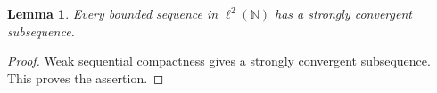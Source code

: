 \documentclass{article}
\newtheorem{lemma}{Lemma}
\begin{document}
\begin{lemma}\label{lem:hilbert}
Every bounded sequence in $\ell^2(\mathbb N)$ has a strongly convergent subsequence.
\end{lemma}
\begin{proof}
Weak sequential compactness gives a strongly convergent subsequence.
This proves the assertion.
\end{proof}
\end{document}
